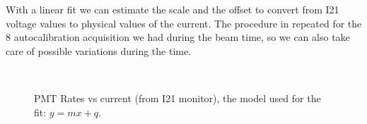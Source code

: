 With a linear fit we can estimate the scale and the offset to convert from I21 voltage values to physical values of the current. The procedure in repeated for the $8$ autocalibration acquisition we had during the beam time, so we can also take care of possible variations during the time.

\begin{figure}[ht]
\centering
{} \\
\end{figure}

\begin{figure}[hbtp]
\centering
{}
\caption{PMT Rates vs current (from I21 monitor), the model used for the fit: $y = mx + q$.}
\end{figure}

